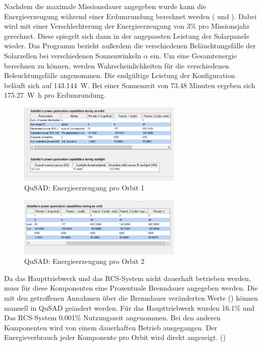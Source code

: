 Nachdem die maximale Missionsdauer angegeben wurde kann die Energieerzeugung während einer Erdumrundung berechnet werden ( und ). Dabei wird mit einer  Verschlechterung der Energieerzeugung von \num{3}\% pro Missionsjahr gerechnet. Diese spiegelt sich dann in der angepassten Leistung der Solarpanele wieder. Das Programm bezieht außerdem die verschiedenen Beläuchtungsfälle der Solarzellen bei verschiedenen Sonnenwinkeln $\alpha$ ein. Um eine Gesamtenergie berechnen zu können,  werden Wahrscheinlichkeiten für die verschiedenen Beleuchtungsfälle angenommen. Die endgültige Leistung der Konfiguration beläuft sich auf \SI{143,144}{\watt}. Bei einer Sonnenzeit von \num{73,48} Minuten ergeben sich \SI{175,27}{\watt\hour} pro Erdumrundung. 
			
			\begin{figure}[H]
				\centering
					\includegraphics[width=0.70\textwidth]{graphics/power3.png}
				\caption{QuSAD: Energieerzeugung pro Orbit 1}
				\label{fig:power3}
			\end{figure}
			
			\begin{figure}[H]
				\centering
					\includegraphics[width=0.70\textwidth]{graphics/power4.PNG}
				\caption{QuSAD: Energieerzeugung pro Orbit 2}
				\label{fig:power4}
			\end{figure}
Da das Haupttriebwerk und das RCS-System nicht dauerhaft betrieben werden, muss für diese Komponenten eine Prozentuale Brenndauer angegeben werden. Die mit den getroffenen Annahmen über die Brenndauer veränderten Werte  () können manuell in QuSAD geändert werden. Für das Haupttriebwerk wurden \num{16,1}\% und Das RCS-System \num{0,001}\% Nutzungszeit angenommen. Bei den anderen Komponenten wird von einem dauerhaften Betrieb ausgegangen. Der Energieverbrauch jeder Komponente pro Orbit wird direkt angezeigt. ()
			

